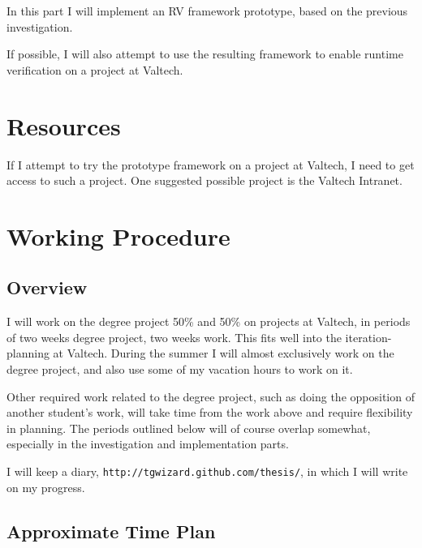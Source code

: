 \documentclass[a4paper,11pt]{article}
\begin{document}
In this part I will implement an RV framework prototype, based on the previous
investigation.

If possible, I will also attempt to use the resulting framework to enable runtime verification on a project at Valtech.


\section{Resources}

If I attempt to try the prototype framework on a project at Valtech, I need to get access to such a project. One suggested possible project is the Valtech Intranet.


\section{Working Procedure}

\subsection{Overview}

I will work on the degree project 50\% and 50\% on projects at Valtech, in periods of
two weeks degree project, two weeks work. This fits well into the iteration-planning at
Valtech. During the summer I will almost exclusively work on the degree project, and also
use some of my vacation hours to work on it.

Other required work related to the degree project, such as doing the opposition of
another student's work, will take time from the work above and require
flexibility in planning. The periods outlined below will of course overlap
somewhat, especially in the investigation and implementation parts.

I will keep a diary, \texttt{http://tgwizard.github.com/thesis/}, in which I will write on my progress. 

\subsection{Approximate Time Plan}
\end{document}
